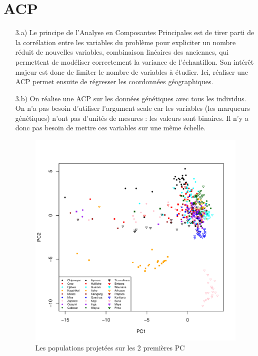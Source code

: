 \documentclass[a4paper, 12pt]{article}
\begin{document}
\section{ACP}
\begin{enumerate}
\setlength{\itemsep}{20pt}
\item[3.a)]
 Le principe de l'Analyse en Composantes Principales est de tirer parti de la corrélation entre les variables du problème pour expliciter un nombre réduit de nouvelles variables, combinaison linéaires des anciennes, qui permettent de modéliser correctement la variance de l'échantillon. Son intérêt majeur est donc de limiter le nombre de variables à étudier. Ici, réaliser une ACP permet ensuite de régresser les coordonnées géographiques.

 \item[3.b)]
 On réalise une ACP sur les données génétiques avec tous les individus. 
 On n'a pas besoin d'utiliser l'argument scale car les variables (les marqueurs génétiques) n'ont pas d'unités de mesures : les valeurs sont binaires. Il n'y a donc pas besoin de mettre ces variables sur une même échelle.

\begin{figure}[!h]
\begin{center}
\includegraphics[scale=1]{acp12.pdf}
\caption{Les populations projetées sur les 2 premières PC}
\end{center}
\end{figure}


\end{enumerate}
\end{document}
